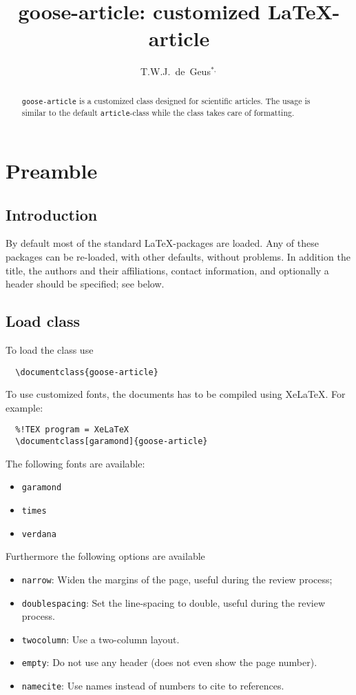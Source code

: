 \documentclass[garamond,namecite]{goose-article}
\title{%
  goose-article: customized \LaTeX-article
}
\author[1]{T.W.J.~de~Geus$^{*,}$}
\affil[1]{
  Physics Institute \nl
  \'{E}cole Polytechnique F\'{e}d\'{e}rale de Lausanne (EPFL) \nl
  Switzerland
}
\begin{document}
\maketitle

\begin{abstract}
\texttt{goose-article} is a customized class designed for scientific articles. The usage is similar to the default \texttt{article}-class while the class takes care of formatting.
\end{abstract}


\section{Preamble}

\subsection{Introduction}

By default most of the standard \LaTeX-packages are loaded. Any of these packages can be re-loaded, with other defaults, without problems. In addition the title, the authors and their affiliations, contact information, and optionally a header should be specified; see below.

\subsection{Load class}

To load the class use
%
\begin{verbatim}
  \documentclass{goose-article}
\end{verbatim}
%
To use customized fonts, the documents has to be compiled using XeLaTeX. For example:
%
\begin{verbatim}
  %!TEX program = XeLaTeX
  \documentclass[garamond]{goose-article}
\end{verbatim}
%
The following fonts are available:
%
\begin{itemize}
  \item \texttt{garamond}
  \item \texttt{times}
  \item \texttt{verdana}
\end{itemize}
%
Furthermore the following options are available
%
\begin{itemize}
  \item \texttt{narrow}: Widen the margins of the page, useful during the review process;
  \item \texttt{doublespacing}: Set the line-spacing to double, useful during the review process.
  \item \texttt{twocolumn}: Use a two-column layout.
  \item \texttt{empty}: Do not use any header (does not even show the page number).
  \item \texttt{namecite}: Use names instead of numbers to cite to references.
\end{itemize}
%
\end{document}
